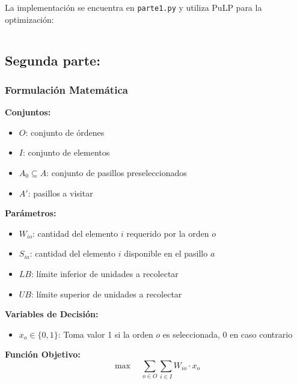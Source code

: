 \documentclass[a4paper,12pt]{article}
\begin{document}
La implementación se encuentra en \texttt{parte1.py} y utiliza PuLP para la optimización:

\begin{lstlisting}[language=Python, caption=Implementación clave de la parte 1]

\end{lstlisting}

\clearpage

\subsection{Segunda parte:}
\label{sec:variante2}

\subsubsection{Formulación Matemática}

\textbf{Conjuntos:}
\begin{itemize}
    \item $O$: conjunto de órdenes
    \item $I$: conjunto de elementos
    \item $A_0 \subseteq A$: conjunto de pasillos preseleccionados
    \item $A'$: pasillos a visitar
\end{itemize}

\textbf{Parámetros:}
\begin{itemize}
    \item $W_{io}$: cantidad del elemento $i$ requerido por la orden $o$
    \item $S_{ia}$: cantidad del elemento $i$ disponible en el pasillo $a$
    \item $LB$: límite inferior de unidades a recolectar
    \item $UB$: límite superior de unidades a recolectar
\end{itemize}

\textbf{Variables de Decisión:}
\begin{itemize}
    \item $x_o \in \{0,1\}$: Toma valor 1 si la orden $o$ es seleccionada, 0 en caso contrario
\end{itemize}

\textbf{Función Objetivo:}
\begin{equation}
\operatorname{max} \quad \sum_{o \in O} \sum_{i \in I} W_{io} \cdot x_o
\end{equation}
\end{document}

